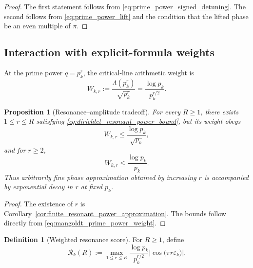 \documentclass[11pt]{amsart}
\numberwithin{equation}{section}
\theoremstyle{plain}
\newtheorem{proposition}[theorem]{Proposition}
\theoremstyle{definition}
\newtheorem{definition}[theorem]{Definition}
\theoremstyle{remark}
\begin{document}
\begin{proof}
The first statement follows from
\eqref{eq:prime_power_signed_detuning}.  The second follows from
\eqref{eq:prime_power_lift} and the condition that the lifted phase be an
even multiple of $\pi$.
\end{proof}

\subsection{Interaction with explicit-formula weights}
\label{subsec:explicit_formula_weights}

At the prime power $q=p_k^r$, the critical-line arithmetic weight is
\begin{equation}
 W_{k,r}
 :=\frac{\Lambda(p_k^r)}{\sqrt{p_k^r}}
 =\frac{\log p_k}{p_k^{r/2}}.
 \label{eq:mangoldt_prime_power_weight}
\end{equation}

\begin{proposition}[Resonance--amplitude tradeoff]
\label{prop:resonance_amplitude_tradeoff}
For every $R\geq1$, there exists $1\leq r\leq R$ satisfying
\eqref{eq:dirichlet_resonant_power_bound}, but its weight obeys
\begin{equation}
 W_{k,r}\leq\frac{\log p_k}{\sqrt{p_k}},
 \label{eq:weight_upper_all_r}
\end{equation}
and for $r\geq2$,
\begin{equation}
 W_{k,r}\leq\frac{\log p_k}{p_k}.
 \label{eq:weight_upper_proper_power}
\end{equation}
Thus arbitrarily fine phase approximation obtained by increasing $r$ is
accompanied by exponential decay in $r$ at fixed $p_k$.
\end{proposition}

\begin{proof}
The existence of $r$ is Corollary~\ref{cor:finite_resonant_power_approximation}.
The bounds follow directly from \eqref{eq:mangoldt_prime_power_weight}.
\end{proof}

\begin{definition}[Weighted resonance score]
\label{def:weighted_resonance_score}
For $R\geq1$, define
\begin{equation}
 \mathcal R_k(R)
 :=\max_{1\leq r\leq R}
 \frac{\log p_k}{p_k^{r/2}}
 \left|\cos\bigl(\pi r\varepsilon_k\bigr)\right|.
 \label{eq:weighted_resonance_score}
\end{equation}
\end{definition}
\end{document}

